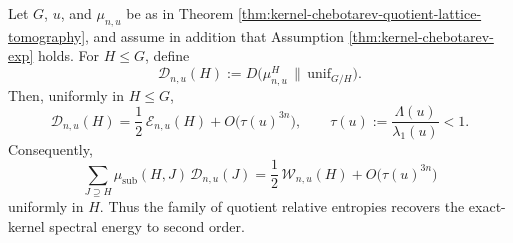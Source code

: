 \begin{theorem}\label{thm:kernel-chebotarev-entropy-tomography}
Let \(G\), \(u\), and \(\mu_{n,u}\) be as in Theorem \ref{thm:kernel-chebotarev-quotient-lattice-tomography}, and assume in addition that Assumption \ref{thm:kernel-chebotarev-exp} holds. For \(H\le G\), define
\[
\mathcal D_{n,u}(H)
:=
D\!\bigl(\mu_{n,u}^H\,\|\,\mathrm{unif}_{G/H}\bigr).
\]
Then, uniformly in \(H\le G\),
\[
\mathcal D_{n,u}(H)
=
\frac12\,\mathcal E_{n,u}(H)
+
O\!\bigl(\tau(u)^{3n}\bigr),
\qquad
\tau(u):=\frac{\Lambda(u)}{\lambda_1(u)}<1.
\]
Consequently,
\[
\sum_{J\supseteq H}\mu_{\mathrm{sub}}(H,J)\,\mathcal D_{n,u}(J)
=
\frac12\,\mathcal W_{n,u}(H)
+
O\!\bigl(\tau(u)^{3n}\bigr)
\]
uniformly in \(H\). Thus the family of quotient relative entropies recovers the exact-kernel spectral energy to second order.
\end{theorem}

